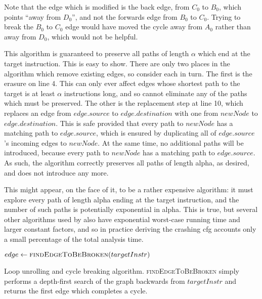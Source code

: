 Note that the edge which is modified is the back edge, from $C_0$ to
$B_0$, which points ``away from $D_0$'', and not the forwards edge
from $B_0$ to $C_0$.  Trying to break the $B_0$ to $C_0$ edge would
have moved the cycle away from $A_0$ rather than away from $D_0$,
which would not be helpful.

This algorithm is guaranteed to preserve all paths of length $\alpha$
which end at the target instruction.  This is easy to show.  There are
only two places in the algorithm which remove existing edges, so
consider each in turn.  The first is the erasure on line 4.  This can
only ever affect edges whose shortest path to the target is at least
$\alpha$ instructions long, and so cannot eliminate any of the paths
which must be preserved.  The other is the replacement step at line
10, which replaces an edge from $edge.source$ to $edge.destination$
with one from $newNode$ to $edge.destination$.  This is safe provided
that every path to $newNode$ has a matching path to $edge.source$,
which is ensured by duplicating all of $edge.source$'s incoming edges
to $newNode$.  At the same time, no additional paths will be
introduced, because every path to $newNode$ has a matching path to
$edge.source$.  As such, the algorithm correctly preserves all paths
of length \gls{alpha}, as desired, and does not introduce any more.

This might appear, on the face of it, to be a rather expensive
algorithm: it must explore every path of length \gls{alpha} ending at
the target instruction, and the number of such paths is potentially
exponential in \gls{alpha}.  This is true, but several other
algorithms used by {\implementation} also have exponential worst-case
running time and larger constant factors, and so in practice deriving
the crashing \gls{cfg} accounts only a small percentage of the total
analysis time.

\begin{sanefig}
\begin{algorithmic}[1]
     \State $edge \gets \textsc{findEdgeToBeBroken}(targetInstr)$
     \Else
        \EndFor
     \EndIf
  \EndWhile
\end{algorithmic}
\caption{Loop unrolling and cycle breaking algorithm.
  \textsc{findEdgeToBeBroken} simply performs a depth-first search of
  the graph backwards from $targetInstr$ and returns the first edge
  which completes a cycle.}
\label{fig:derive:read:unroll_cycle_break}
\end{sanefig}

